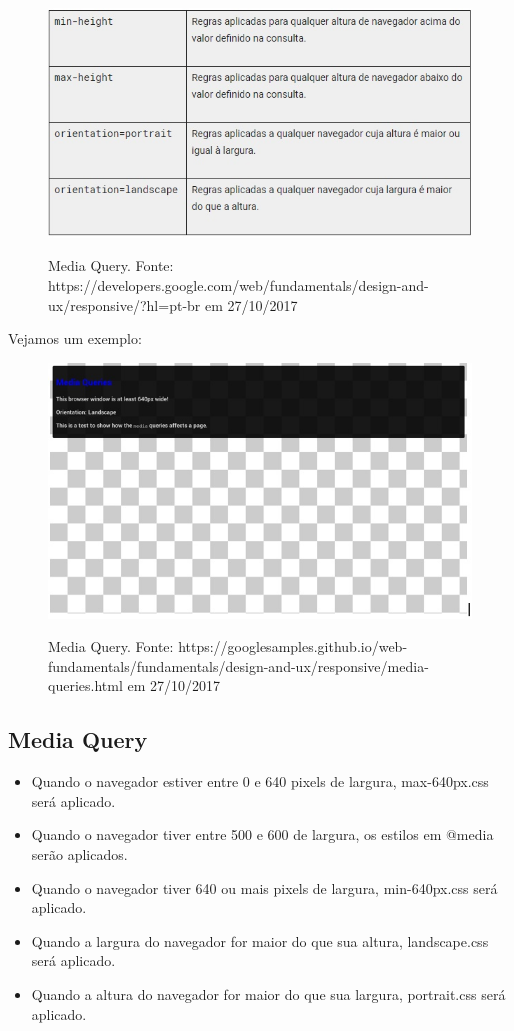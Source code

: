 \documentclass[12pt,a4paper]{article}
\begin{document}
\begin{figure}[!htb]
\centering
\includegraphics[width=15cm]{recursos/2.jpg}
\label{Media}
\caption{Media Query. Fonte: https://developers.google.com/web/fundamentals/design-and-ux/responsive/?hl=pt-br em 27/10/2017}
\end{figure}

Vejamos um exemplo:

\begin{figure}[!htb]
\centering
\includegraphics[width=15cm]{recursos/3.jpg}
\label{Media}
\caption{Media Query. Fonte: https://googlesamples.github.io/web-fundamentals/fundamentals/design-and-ux/responsive/media-queries.html em 27/10/2017}
\end{figure}

\subsection{Media Query} 


\begin{itemize}
\item Quando o navegador estiver entre 0 e 640 pixels de largura,  max-640px.css será aplicado.
\item Quando o navegador tiver entre 500 e 600 de largura, os estilos em @media serão aplicados.
\item Quando o navegador tiver 640 ou mais pixels de largura, min-640px.css será aplicado.
\item Quando a largura do navegador for maior do que sua altura, landscape.css será aplicado.
\item Quando a altura do navegador for maior do que sua largura, portrait.css será aplicado.
\end{itemize}
\end{document}

